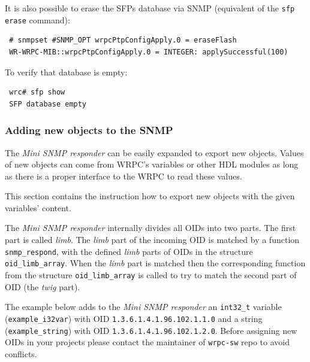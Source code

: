 \documentclass[a4paper, 12pt]{article}
\newcommand{\codeHook}[1]{\mbox{\ttfamily\MakeTextUppercase{#1}}}
\begin{document}
It is also possible to erase the SFPs database via SNMP (equivalent of
the \texttt{sfp erase} command):
\begin{lstlisting}
 # snmpset #SNMP_OPT wrpcPtpConfigApply.0 = eraseFlash
 WR-WRPC-MIB::wrpcPtpConfigApply.0 = INTEGER: applySuccessful(100)
\end{lstlisting}

To verify that database is empty:
\begin{lstlisting}
 wrc# sfp show
 SFP database empty
\end{lstlisting}

\label{Adding new objects to the SNMP}
\subsubsection{Adding new objects to the SNMP}

The \textit{Mini SNMP responder} can be easily expanded to export new objects.
Values of new objects can come from \codeHook{wrpc}'s variables or other HDL modules
as long as there is a proper interface to the \codeHook{wrpc} to read these values.

This section contains the instruction how to export new objects with
the given variables' content.

The \textit{Mini SNMP responder} internally divides all OIDs into two parts.
The first part is called \textit{limb}. The \textit{limb} part of the incoming OID is
matched by a function \texttt{snmp\_respond}, with the defined \textit{limb} parts of OIDs
in the structure \texttt{oid\_limb\_array}.
When the \textit{limb} part is matched then the corresponding function from
the structure \texttt{oid\_limb\_array} is called to try to match the second part of
OID (the \textit{twig} part).

The example below adds to the \textit{Mini SNMP responder} an \texttt{int32\_t} variable
(\texttt{example\_i32var}) with OID \texttt{1.3.6.1.4.1.96.102.1.1.0} and a string
(\texttt{example\_string}) with OID \texttt{1.3.6.1.4.1.96.102.1.2.0}.
Before assigning new OIDs in your projects please contact the maintainer of
\texttt{wrpc-sw} repo to avoid conflicts.
\end{document}
